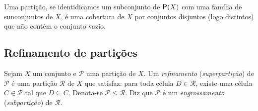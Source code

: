 Uma partição, se identidicamos um subconjunto de $\p(X)$ com uma família de sunconjuntos de $X$, é uma cobertura de $X$ por conjuntos disjuntos (logo distintos) que não contém o conjunto vazio.

\subsection{Refinamento de partições}

\begin{definition}
Sejam $X$ um conjunto e $\mathcal P$ uma partição de $X$. Um \emph{refinamento} (\emph{superpartição}) de $\mathcal P$ é uma partição $\mathcal R$ de $X$ que satisfaz: para toda célula $D \in \mathcal R$, existe uma célula $C \in \mathcal P$ tal que $D \subseteq C$. Denota-se $\mathcal P \leq \mathcal R$. Diz que $\mathcal P$ é um \emph{engrossamento} (\emph{subpartição}) de $\mathcal R$.
\end{definition}


